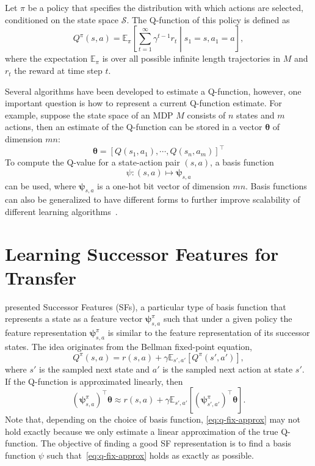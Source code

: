 \documentclass{article}
\begin{document}
Let $\pi$ be a policy that specifies the distribution with which actions are selected, conditioned on the state space $\mathcal{S}$.
The Q-function of this policy is defined as
\begin{equation}
Q^\pi(s,a) = \mathbb{E}_\pi \left[ \sum_{t=1}^\infty \gamma^{t-1} r_t \middle| s_1 = s, a_1 = a \right], \label{eq:q-fn}
\end{equation}
where the expectation $\mathbb{E}_\pi$ is over all possible infinite length trajectories in $M$ and $r_t$ the reward at time step $t$. 

Several algorithms have been developed to estimate a Q-function, however, one important question is how to represent a current Q-function estimate.
For example, suppose the state space of an MDP $M$ consists of $n$ states and $m$ actions, then an estimate of the Q-function can be stored in a vector $\pmb{\theta}$ of dimension $mn$:
\begin{equation}
\pmb{\theta} = \left[ Q(s_1,a_1), \cdots ,Q(s_n,a_m) \right]^\top \label{eq:q-tab}
\end{equation} 
To compute the Q-value for a state-action pair $(s,a)$, a basis function 
\begin{equation}
\psi: (s,a) \mapsto \pmb{\psi}_{s,a}
\end{equation}
can be used, where $\pmb{\psi}_{s,a}$ is a one-hot bit vector of dimension $mn$.
Basis functions can also be generalized to have different forms to further improve scalability of different learning algorithms~\cite{sutton1996generalization,konidaris2008fourier}.

\section{Learning Successor Features for Transfer}

\citet{dayan1993successor} presented Successor Features (SFs), a particular type of basis function that represents a state as a feature vector $\pmb{\psi}^\pi_{s,a}$ such that under a given policy the feature representation $\pmb{\psi}^\pi_{s,a}$ is similar to the feature representation of its successor states.
The idea originates from the Bellman fixed-point equation,
\begin{equation}
Q^\pi(s,a) = r(s,a) + \gamma \mathbb{E}_{s',a'}  \left[ Q^\pi(s',a') \right], \label{eq:Q-bellman-fix}
\end{equation}
where $s'$ is the sampled next state and $a'$ is the sampled next action at state $s'$.
If the Q-function is approximated linearly, then 
\begin{equation}
(\pmb{\psi}^\pi_{s,a})^\top \pmb{\theta} \approx r(s,a) + \gamma \mathbb{E}_{s',a'}  \left[ (\pmb{\psi}^\pi_{s',a'})^\top \pmb{\theta} \right]. \label{eq:q-fix-approx}
\end{equation}
Note that, depending on the choice of basis function, \eqref{eq:q-fix-approx} may not hold exactly because we only estimate a linear approximation of the true Q-function.
The objective of finding a good SF representation is to find a basis function $\psi$ such that~\eqref{eq:q-fix-approx} holds as exactly as possible.
\end{document}
